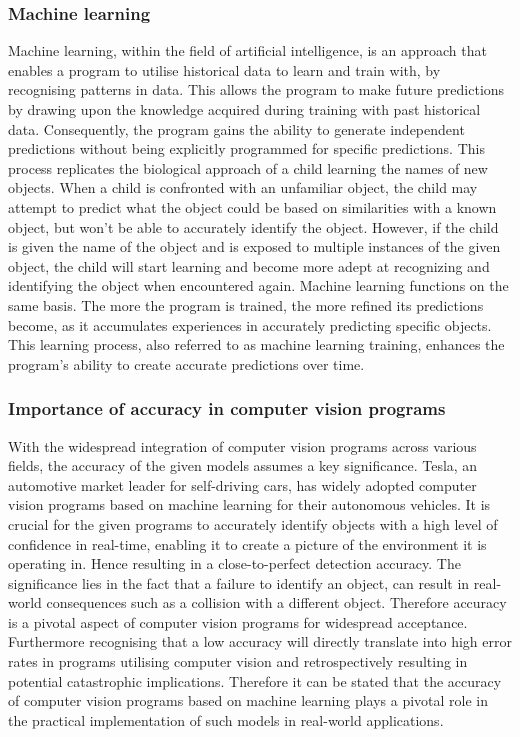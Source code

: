 \subsubsection{Machine learning }
Machine learning, within the field of artificial intelligence, is an approach that enables a program to utilise historical data to learn and train with, by recognising patterns in data. This allows the program to make future predictions by drawing upon the knowledge acquired during training with past historical data. Consequently, the program gains the ability to generate independent predictions without being explicitly programmed for specific predictions. This process replicates the biological approach of a child learning the names of new objects. When a child is confronted with an unfamiliar object, the child may attempt to predict what the object could be based on similarities with a known object, but won't be able to accurately identify the object. However,  if the child is given the name of the object and is exposed to multiple instances of the given object, the child will start learning and become more adept at recognizing and identifying the object when encountered again. Machine learning functions on the same basis. The more the program is trained, the more refined its predictions become, as it accumulates experiences in accurately predicting specific objects. This learning process, also referred to as machine learning training, enhances the program's ability to create accurate predictions over time. 

\subsubsection{Importance of accuracy in computer vision programs}
With the widespread integration of computer vision programs across various fields, the accuracy of the given models assumes a key significance. Tesla, an automotive market leader for self-driving cars, has widely adopted computer vision programs based on machine learning for their autonomous vehicles. It is crucial for the given programs to accurately identify objects with a high level of confidence in real-time, enabling it to create a picture of the environment it is operating in. Hence resulting in a close-to-perfect detection accuracy. The significance lies in the fact that a failure to identify an object, can result in real-world consequences such as a collision with a different object. Therefore accuracy is a pivotal aspect of computer vision programs for widespread acceptance. Furthermore recognising that a low accuracy will directly translate into high error rates in programs utilising computer vision and retrospectively resulting in potential catastrophic implications. Therefore it can be stated that the accuracy of computer vision programs based on machine learning plays a pivotal role in the practical implementation of such models in real-world applications. 


